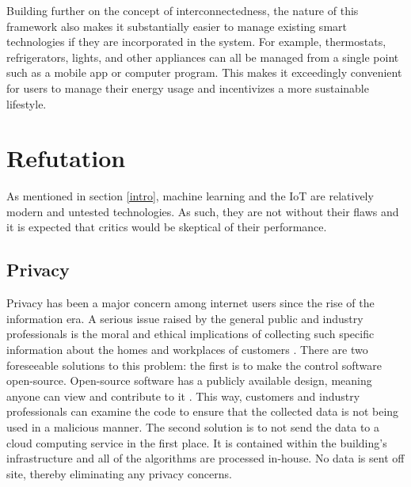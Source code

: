 \documentclass[letterpaper]{article}
\begin{document}
Building further on the concept of interconnectedness, the nature of this framework also makes it substantially easier to manage existing smart technologies if they are incorporated in the system. For example, thermostats, refrigerators, lights, and other appliances can all be managed from a single point such as a mobile app or computer program. This makes it exceedingly convenient for users to manage their energy usage and incentivizes a more sustainable lifestyle.

\section{Refutation} \label{refute}
As mentioned in section \ref{intro}, machine learning and the IoT are relatively modern and untested technologies. As such, they are not without their flaws and it is expected that critics would be skeptical of their performance.\par

\subsection{Privacy} \label{privacy}
Privacy has been a major concern among internet users since the rise of the information era. A serious issue raised by the general public and industry professionals is the moral and ethical implications of collecting such specific information about the homes and workplaces of customers \cite{perisic16, mccalman17}. There are two foreseeable solutions to this problem: the first is to make the control software open-source. Open-source software has a publicly available design, meaning anyone can view and contribute to it \cite{opensource}. This way, customers and industry professionals can examine the code to ensure that the collected data is not being used in a malicious manner. The second solution is to not send the data to a cloud computing service in the first place. It is contained within the building's infrastructure and all of the algorithms are processed in-house. No data is sent off site, thereby eliminating any privacy concerns.\par
\end{document}
